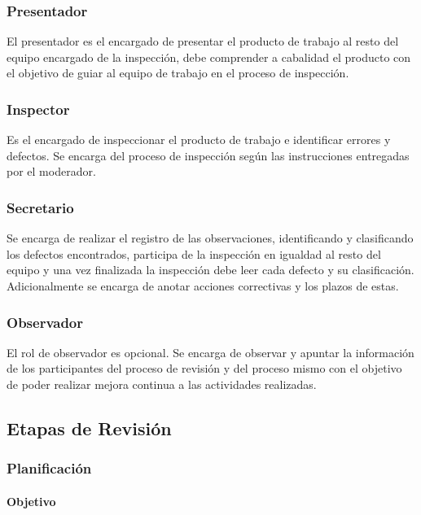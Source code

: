 \subsubsection{Presentador}

El presentador es el encargado de presentar el producto de trabajo al resto del equipo encargado de la inspección, debe comprender a cabalidad el producto con el objetivo de guiar al equipo de trabajo en el proceso de inspección. 

\subsubsection{Inspector}

Es el encargado de inspeccionar el producto de trabajo e identificar errores y defectos. Se encarga del proceso de inspección según las instrucciones entregadas por el moderador. 

\subsubsection{Secretario}

Se encarga de realizar el registro de las observaciones, identificando y clasificando los defectos encontrados, participa de la inspección en igualdad al resto del equipo y una vez finalizada la inspección debe leer cada defecto y su clasificación. Adicionalmente se encarga de anotar acciones correctivas y los plazos de estas. 

\subsubsection{Observador}

El rol de observador es opcional. Se encarga de observar y apuntar la información de los participantes del proceso de revisión y del proceso mismo con el objetivo de poder realizar mejora continua a las actividades realizadas. 

\subsection{Etapas de Revisión}

\subsubsection{Planificación}

\paragraph{Objetivo\\}

